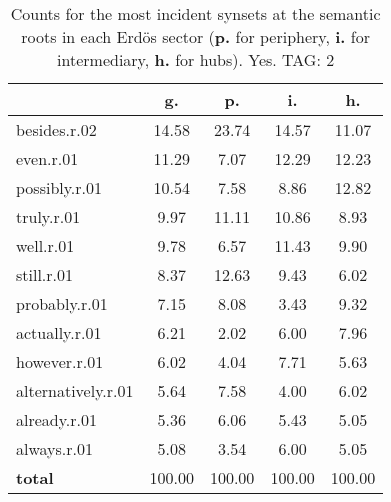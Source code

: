 \begin{table}[h!]
\begin{center}
\begin{tabular}{| l || c | c | c | c |}\hline
 & {\bf g.} & {\bf p.} & {\bf i.} & {\bf h.} \\\hline\hline
besides.r.02 & 14.58  & 23.74  & 14.57  & 11.07 \\\hline
even.r.01 & 11.29  & 7.07  & 12.29  & 12.23 \\\hline
possibly.r.01 & 10.54  & 7.58  & 8.86  & 12.82 \\\hline
truly.r.01 & 9.97  & 11.11  & 10.86  & 8.93 \\\hline
well.r.01 & 9.78  & 6.57  & 11.43  & 9.90 \\\hline
still.r.01 & 8.37  & 12.63  & 9.43  & 6.02 \\\hline
probably.r.01 & 7.15  & 8.08  & 3.43  & 9.32 \\\hline
actually.r.01 & 6.21  & 2.02  & 6.00  & 7.96 \\\hline
however.r.01 & 6.02  & 4.04  & 7.71  & 5.63 \\\hline
alternatively.r.01 & 5.64  & 7.58  & 4.00  & 6.02 \\\hline
already.r.01 & 5.36  & 6.06  & 5.43  & 5.05 \\\hline
always.r.01 & 5.08  & 3.54  & 6.00  & 5.05 \\\hline\hline
{{\bf total}} & 100.00  & 100.00  & 100.00  & 100.00 \\\hline
\end{tabular}
\caption{Counts for the most incident synsets at the semantic roots in each Erd\"os sector ({\bf p.} for periphery, {\bf i.} for intermediary, {\bf h.} for hubs). Yes. TAG: 2}
\end{center}
\end{table}